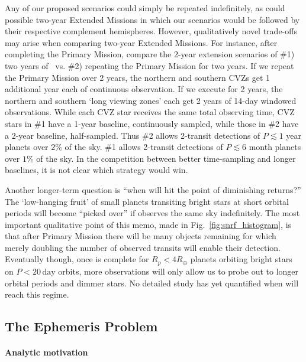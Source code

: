 Any of our proposed scenarios could simply be repeated indefinitely,
as could possible two-year Extended Missions in which our scenarios 
would be followed by their respective complement hemispheres.
However, qualitatively novel trade-offs may arise when comparing two-year
Extended Missions.
For instance, after completing the Primary Mission, compare the 2-year
extension scenarios of \#1) two years of \hemis\ vs. \#2) repeating the 
Primary Mission for two years.
If we repeat the Primary Mission over 2 years, the northern
and southern CVZs get 1 additional year each of continuous observation.  
If we execute \hemis\:for 2 years, the northern and southern `long viewing
zones' each get 2 years of 14-day windowed observations. 
While each CVZ star receives the same total observing time, CVZ stars in \#1 
have a 1-year baseline, continuously sampled, while those in \#2 have a 2-year 
baseline, half-sampled.
Thus \#2 allows 2-transit detections of $P\lesssim1$ year planets over
$2\%$ of the sky.  \#1 allows 2-transit detections of
$P\lesssim6$ month planets over $1\%$ of the sky.  
In the competition between better time-sampling and longer baselines,
it is not clear which strategy would win.

Another longer-term question is ``when will \tess hit the point of
diminishing returns?''  The `low-hanging fruit' of small planets
transiting bright stars at short orbital periods will become 
``picked over'' if \tess observes the same sky indefinitely.  
The most important
qualitative point of this memo, made in Fig.~\ref{fig:snrf_histogram},
is that after \tesss Primary Mission there will be many objects
remaining for which merely doubling the number of observed transits
will enable their detection.  Eventually though, once \tess is complete
for $R_p<4R_\oplus$ planets orbiting bright stars on $P<20\,\mathrm{day}$ 
orbits, more observations will
only allow us to probe out to longer orbital periods and dimmer stars.
No detailed study has yet quantified when \tess will reach this
regime.

\subsection{The Ephemeris Problem}
\label{sec:ephemeris_times}

\paragraph{Analytic motivation}

